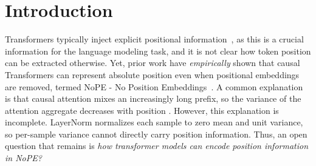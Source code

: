 \documentclass{article}
\theoremstyle{plain}
\theoremstyle{definition}
\theoremstyle{remark}
\begin{document}
\section{Introduction}

Transformers typically inject explicit positional information~\citep{vaswani2017attention, wang2021rotary, alibi}, as this is a crucial information for the language modeling task, and it is not clear how token position can be extracted otherwise.
Yet, prior work have \textit{empirically} shown that causal Transformers can represent absolute position even when positional embeddings are removed, termed NoPE - No Position Embeddings~\citep{haviv2022transformer, chi-etal-2023-latent, kazemnejad2023lenghGeneralization}.
A common explanation is that causal attention mixes an increasingly long prefix, so the variance of the attention aggregate decreases with position \citep{chi-etal-2023-latent}.
However, this explanation is incomplete.
LayerNorm \citep{ba2016layer} normalizes each sample to zero mean and unit variance, so per-sample variance cannot directly carry position information. Thus, an open question that remains is \textit{how transformer models can encode position information in NoPE?}
\end{document}
